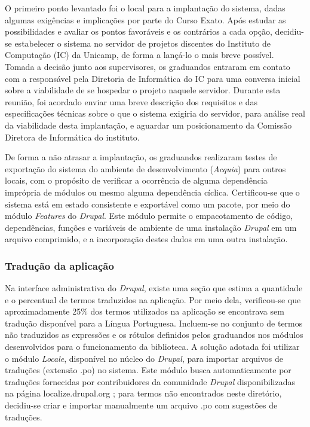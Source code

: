 \documentclass[a4paper]{article}
\begin{document}
O primeiro ponto levantado foi o local para a implantação do sistema, dadas algumas exigências e implicações por parte do Curso Exato. Após estudar as possibilidades e avaliar os pontos favoráveis e os contrários a cada opção, decidiu-se estabelecer o sistema no servidor de projetos discentes do Instituto de Computação (IC) da Unicamp, de forma a lançá-lo o mais breve possível. Tomada a decisão junto aos supervisores, os graduandos entraram em contato com a responsável pela Diretoria de Informática do IC para uma conversa inicial sobre a viabilidade de se hospedar o projeto naquele servidor. Durante esta reunião, foi acordado enviar uma breve descrição dos requisitos e das especificações técnicas sobre o que o sistema exigiria do servidor, para análise real da viabilidade desta implantação, e aguardar um posicionamento da Comissão Diretora de Informática do instituto.

De forma a não atrasar a implantação, os graduandos realizaram testes de exportação do sistema do ambiente de desenvolvimento (\textit{Acquia}) para outros locais, com o propósito de verificar a ocorrência de alguma dependência imprópria de módulos ou mesmo alguma dependência cíclica. Certificou-se que o sistema está em estado consistente e exportável como um pacote, por meio do módulo \textit{Features} do \textit{Drupal}. Este módulo permite o empacotamento de código, dependências, funções e variáveis de ambiente de uma instalação \textit{Drupal} em um arquivo comprimido, e a incorporação destes dados em uma outra instalação.

\subsubsection{Tradução da aplicação}

Na interface administrativa do \textit{Drupal}, existe uma seção que estima a quantidade e o percentual de termos traduzidos na aplicação. Por meio dela, verificou-se que aproximadamente 25\% dos termos utilizados na aplicação se encontrava sem tradução disponível para a Língua Portuguesa. Incluem-se no conjunto de termos não traduzidos as expressões e os rótulos definidos pelos graduandos nos módulos desenvolvidos para o funcionamento da biblioteca. A solução adotada foi utilizar o módulo \textit{Locale}, disponível no núcleo do \textit{Drupal}, para importar arquivos de traduções (extensão .po) no sistema. Este módulo busca automaticamente por traduções fornecidas por contribuidores da comunidade \textit{Drupal} disponibilizadas na página localize.drupal.org \cite{localize}; para termos não encontrados neste diretório, decidiu-se criar e importar manualmente um arquivo .po com sugestões de traduções.
\end{document}
